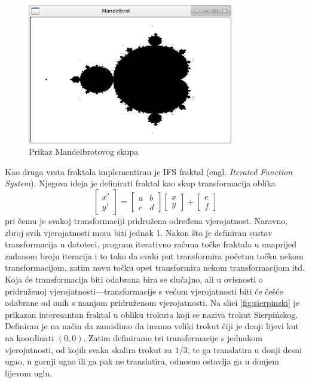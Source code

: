 \documentclass[a4paper,12pt]{article}
\begin{document}
\begin{figure}[H]
  \centering
  \includegraphics[width=0.8\textwidth]{img/mandelbrot.png}
  \caption{Prikaz Mandelbrotovog skupa}
  \label{fig:mandelbrot}
\end{figure}

Kao druga vrsta fraktala implementiran je IFS fraktal (engl. {\sl Iterated Function System}).
Njegova ideja je definirati fraktal kao skup transformacija oblika
\[
\begin{bmatrix}
  x'\\
  y'
\end{bmatrix}
=
\begin{bmatrix}
  a & b\\
  c & d
\end{bmatrix}
\begin{bmatrix}
  x\\
  y
\end{bmatrix}
+
\begin{bmatrix}
  e\\
  f
\end{bmatrix}
\]
pri čemu je svakoj transformaciji pridružena određena vjerojatnost. Naravno,
zbroj svih vjerojatnosti mora biti jednak 1. Nakon što je definiran sustav
transformacija u datoteci, program iterativno računa točke fraktala u
unaprijed zadanom broju iteracija i to tako da svaki put transformira
početnu točku nekom transformacijom, zatim novu točku opet transformira nekom
transformacijom itd. Koja će transformacija biti odabrana bira se slučajno,
ali u ovisnosti o pridruženoj vjerojatnosti---transformacije s većom
vjerojatnosti biti će češće odabrane od onih s manjom pridruženom vjerojatnosti. Na slici \ref{fig:sierpinski} je prikazan interesantan fraktal u obliku
trokuta koji se naziva trokut Sierpi{\'n}skog. Definiran je na način
da zamislimo da imamo veliki trokut čiji je donji lijevi kut na koordinati
$(0, 0)$. Zatim definiramo tri transformacije s jednakom vjerojatnosti, od
kojih svaka skalira trokut za $1/3$, te ga translatira u donji desni
ugao, u gornji ugao ili ga pak ne translatira, odnosno ostavlja ga u donjem
lijevom uglu.
\end{document}
